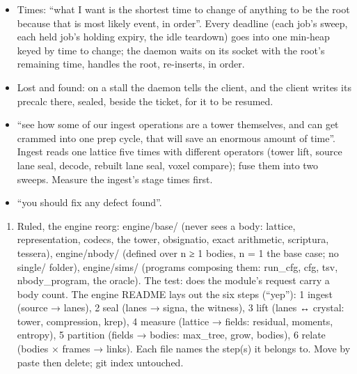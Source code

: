 \begin{itemize}
\item Times: “what I want is the shortest time to change of anything to be the root because that is most likely event, in order”. Every deadline (each job's sweep, each held job's holding expiry, the idle teardown) goes into one min-heap keyed by time to change; the daemon waits on its socket with the root's remaining time, handles the root, re-inserts, in order.
\item Lost and found: on a stall the daemon tells the client, and the client writes its precalc there, sealed, beside the ticket, for it to be resumed.
\item “see how some of our ingest operations are a tower themselves, and can get crammed into one prep cycle, that will save an enormous amount of time”. Ingest reads one lattice five times with different operators (tower lift, source lane seal, decode, rebuilt lane seal, voxel compare); fuse them into two sweeps. Measure the ingest's stage times first.
\item “you should fix any defect found”.
\end{itemize}

\begin{enumerate}
\item Ruled, the engine reorg: engine/base/ (never sees a body: lattice, representation, codecs, the tower, obsignatio, exact arithmetic, scriptura, tessera), engine/nbody/ (defined over n ≥ 1 bodies, n = 1 the base case; no single/ folder), engine/sims/ (programs composing them: run\_\allowbreak{}cfg, cfg, tsv, nbody\_\allowbreak{}program, the oracle). The test: does the module's request carry a body count. The engine README lays out the six steps (“yep”): 1 ingest (source → lanes), 2 seal (lanes → signa, the witness), 3 lift (lanes ↔ crystal: tower, compression, krep), 4 measure (lattice → fields: residual, moments, entropy), 5 partition (fields → bodies: max\_\allowbreak{}tree, grow, bodies), 6 relate (bodies × frames → links). Each file names the step(s) it belongs to. Move by paste then delete; git index untouched.
\end{enumerate}

